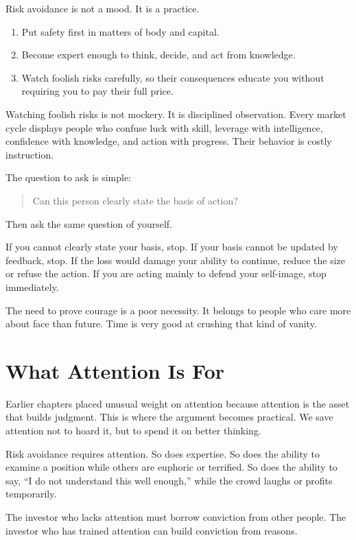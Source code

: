 Risk avoidance is not a mood. It is a practice.

\begin{enumerate}
\item Put safety first in matters of body and capital.
\item Become expert enough to think, decide, and act from knowledge.
\item Watch foolish risks carefully, so their consequences educate you without requiring you to pay their full price.
\end{enumerate}

Watching foolish risks is not mockery. It is disciplined observation. Every market cycle displays people who confuse luck with skill, leverage with intelligence, confidence with knowledge, and action with progress. Their behavior is costly instruction.

The question to ask is simple:

\begin{quote}
Can this person clearly state the basis of action?
\end{quote}

Then ask the same question of yourself.

If you cannot clearly state your basis, stop. If your basis cannot be updated by feedback, stop. If the loss would damage your ability to continue, reduce the size or refuse the action. If you are acting mainly to defend your self-image, stop immediately.

The need to prove courage is a poor necessity. It belongs to people who care more about face than future. Time is very good at crushing that kind of vanity.

\section*{What Attention Is For}

Earlier chapters placed unusual weight on attention because attention is the asset that builds judgment. This is where the argument becomes practical. We save attention not to hoard it, but to spend it on better thinking.

Risk avoidance requires attention. So does expertise. So does the ability to examine a position while others are euphoric or terrified. So does the ability to say, ``I do not understand this well enough,'' while the crowd laughs or profits temporarily.

The investor who lacks attention must borrow conviction from other people. The investor who has trained attention can build conviction from reasons.

